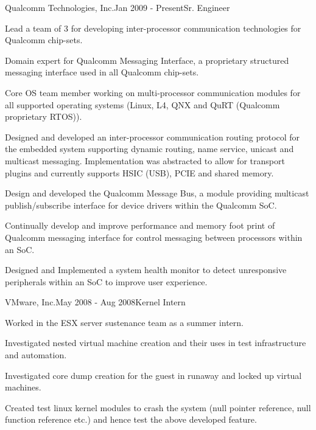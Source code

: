 \begin{rSubsection}{Qualcomm Technologies, Inc.}{Jan 2009 - Present}{Sr. Engineer}{}
  \item Lead a team of 3 for developing inter-processor communication technologies for Qualcomm chip-sets.
  \item Domain expert for Qualcomm Messaging Interface, a proprietary structured messaging interface used in all Qualcomm chip-sets.
  \item Core OS team member working on multi-processor communication modules for all supported operating systems (Linux, L4, QNX and QuRT (Qualcomm proprietary RTOS)).
  \item Designed and developed an inter-processor communication routing protocol for the embedded system supporting dynamic routing, name service, unicast and multicast messaging. Implementation was abstracted to allow for transport plugins and currently supports HSIC (USB), PCIE and shared memory.
  \item Design and developed the Qualcomm Message Bus, a module providing multicast publish/subscribe interface for device drivers within the Qualcomm SoC. 
  \item Continually develop and improve performance and memory foot print of Qualcomm messaging interface for control messaging between processors within an SoC.
  \item Designed and Implemented a system health monitor to detect unresponsive peripherals within an SoC to improve user experience.
\end{rSubsection}


\begin{rSubsection}{VMware, Inc.}{May 2008 - Aug 2008}{Kernel Intern}{}
  \item Worked in the ESX server sustenance team as a summer intern.
  \item Investigated nested virtual machine creation and their uses in test infrastructure and automation.
  \item Investigated core dump creation for the guest in runaway and locked up virtual machines.
  \item Created test linux kernel modules to crash the system (null pointer reference, null function reference etc.) and hence test the above developed feature.
\end{rSubsection}


